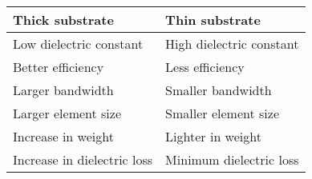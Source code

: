 \documentclass{article}
\begin{document}
	\begin{table}
		\centering
		\begin{tabular}{ |l|l|}
			\hline
				Thick substrate &	Thin substrate \\ \hline
				Low dielectric constant & High dielectric constant  \\ \hline
				Better efficiency &	Less efficiency  \\ \hline
				Larger bandwidth &	Smaller bandwidth  \\ \hline
				Larger element size & Smaller element size  \\ \hline
				Increase in weight &	Lighter in weight  \\ \hline
				Increase in dielectric loss &	Minimum dielectric loss  \\ \hline
			
			
		\end{tabular}
	\end{table}
\end{document}
